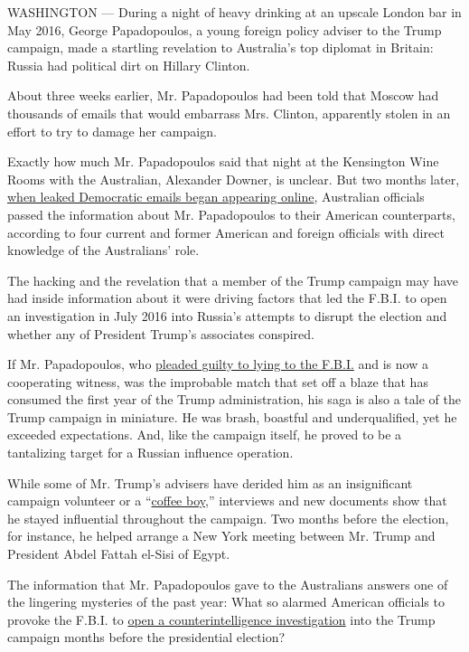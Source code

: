 WASHINGTON --- During a night of heavy drinking at an upscale London bar
in May 2016, George Papadopoulos, a young foreign policy adviser to the
Trump campaign, made a startling revelation to Australia's top diplomat
in Britain: Russia had political dirt on Hillary Clinton.

About three weeks earlier, Mr. Papadopoulos had been told that Moscow
had thousands of emails that would embarrass Mrs. Clinton, apparently
stolen in an effort to try to damage her campaign.

Exactly how much Mr. Papadopoulos said that night at the Kensington Wine
Rooms with the Australian, Alexander Downer, is unclear. But two months
later,
\href{https://www.nytimes3xbfgragh.onion/2016/07/27/us/politics/assange-timed-wikileaks-release-of-democratic-emails-to-harm-hillary-clinton.html}{when
leaked Democratic emails began appearing online}, Australian officials
passed the information about Mr. Papadopoulos to their American
counterparts, according to four current and former American and foreign
officials with direct knowledge of the Australians' role.

The hacking and the revelation that a member of the Trump campaign may
have had inside information about it were driving factors that led the
F.B.I. to open an investigation in July 2016 into Russia's attempts to
disrupt the election and whether any of President Trump's associates
conspired.

If Mr. Papadopoulos, who
\href{https://www.nytimes3xbfgragh.onion/2017/10/30/us/politics/george-papadopoulos-russia-trump.html}{pleaded
guilty to lying to the F.B.I.} and is now a cooperating witness, was the
improbable match that set off a blaze that has consumed the first year
of the Trump administration, his saga is also a tale of the Trump
campaign in miniature. He was brash, boastful and underqualified, yet he
exceeded expectations. And, like the campaign itself, he proved to be a
tantalizing target for a Russian influence operation.

While some of Mr. Trump's advisers have derided him as an insignificant
campaign volunteer or a
``\href{http://www.cnn.com/2017/10/31/politics/caputo-papadopoulos-coffee-boy-cnntv/index.html}{coffee
boy},'' interviews and new documents show that he stayed influential
throughout the campaign. Two months before the election, for instance,
he helped arrange a New York meeting between Mr. Trump and President
Abdel Fattah el-Sisi of Egypt.

The information that Mr. Papadopoulos gave to the Australians answers
one of the lingering mysteries of the past year: What so alarmed
American officials to provoke the F.B.I. to
\href{https://www.nytimes3xbfgragh.onion/2017/03/20/us/politics/fbi-investigation-trump-russia-comey.html}{open
a counterintelligence investigation} into the Trump campaign months
before the presidential election?


